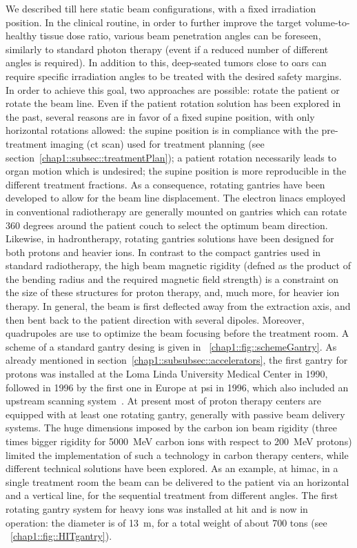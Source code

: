 We described till here static beam configurations,  with a fixed irradiation position. In the clinical routine, in order to further improve the target volume-to-healthy tissue dose ratio, various beam penetration angles can be foreseen, similarly to standard photon therapy (event if a reduced number of different angles is required). In addition to this, deep-seated tumors close to \glspl{oar} can require specific irradiation angles to be treated with the desired safety margins. In order to achieve this goal, two approaches are possible: rotate the patient or rotate the beam line. 
Even if the patient rotation solution has been explored in the past, several reasons are in favor of a fixed supine position, with only horizontal rotations allowed: the supine position is in compliance with the pre-treatment imaging (\gls{ct} scan) used for treatment planning (see section~\ref{chap1::subsec::treatmentPlan}); a patient rotation necessarily leads to organ motion which is undesired; the supine position is more reproducible in the different treatment fractions. As a consequence, rotating gantries have been developed to allow for the beam line displacement.    
The electron linacs employed in conventional radiotherapy are generally mounted on gantries which can rotate 360 degrees around the patient couch to select the optimum beam direction. 
Likewise, in hadrontherapy, rotating gantries solutions have been designed for both protons and heavier ions. In contrast to the compact gantries used in standard radiotherapy, the high beam magnetic rigidity (defned as the product of the bending radius and the required magnetic field strength) is a constraint on the size of these structures for proton therapy, and, much more, for heavier ion therapy. In general, the beam is first deflected away from the extraction axis, and then bent back to the patient direction with several dipoles. Moreover, quadrupoles are use to optimize the beam focusing before the treatment room. A scheme of a standard gantry desing is given in \figurename~\ref{chap1::fig::schemeGantry}. As already mentioned in section~\ref{chap1::subsubsec::accelerators}, the first gantry for protons was installed at the Loma Linda University Medical Center in 1990, followed in 1996 by the first one in Europe at \gls{psi} in 1996, which also included an upstream scanning system~\parencite{Pedroni1995}. At present most of proton therapy centers are equipped with at least one rotating gantry, generally with passive beam delivery systems.
The huge dimensions imposed by the carbon ion beam rigidity (three times bigger rigidity for 5000~MeV carbon ions with respect to 200~MeV protons) limited the implementation of such a technology in carbon therapy centers, while different technical solutions have been explored. As an example, at \gls{himac}, in a single treatment room the beam can be delivered to the patient via an horizontal and a vertical line, for the sequential treatment from different angles. The first rotating gantry system for heavy ions was installed at \gls{hit} and is now in operation: the diameter is of 13~m, for a total weight of about 700 tons (see \figurename~\ref{chap1::fig::HITgantry}).

